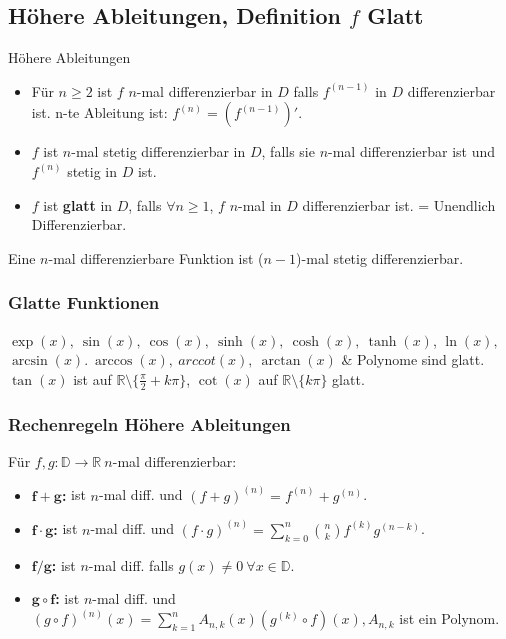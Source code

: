\documentclass[a4paper]{article}
\newcommand\R{\ensuremath{\mathbb{R}}}
\begin{document}
\subsection{Höhere Ableitungen, Definition $f$ Glatt}
\begin{mainbox}{Höhere Ableitungen}
  \begin{itemize}[leftmargin=3mm, topsep=1pt, parsep=1pt]
    \item[1.] Für $n \geq 2$ ist $f$ $n$-mal differenzierbar in $D$ falls $f^{(n-1)}$ in $D$ differenzierbar ist. n-te Ableitung ist: $f^{(n)} = (f^{(n-1)})'$.
    \item[2.] $f$ ist $n$-mal stetig differenzierbar in $D$, falls sie $n$-mal differenzierbar ist und $f^{(n)}$ stetig in $D$ ist.
    \item[3.] $f$ ist \textbf{glatt} in $D$, falls $\forall n \geq 1$, $f$ $n$-mal in $D$ differenzierbar ist. 
        \tiny \color{gray}
          = Unendlich Differenzierbar.
        \normalsize \color{black}
  \end{itemize}
  Eine $n$-mal differenzierbare Funktion ist ($n-1$)-mal stetig differenzierbar.
\end{mainbox}

\subsubsection*{Glatte Funktionen}
$\exp(x), \ \sin(x), \ \cos(x), \ \sinh(x), \ \cosh(x), \ \tanh(x)$, $\ln(x),$ \\ $\arcsin(x). \ \arccos(x), \ arccot(x), \ \arctan(x)$ \& Polynome sind glatt. $\tan(x)$ ist auf $\mathbb{R} \setminus \{\frac{\pi}{2} + k\pi\}$, $\cot(x)$ auf $\mathbb{R} \setminus \{k\pi\}$ glatt.

\subsubsection*{Rechenregeln Höhere Ableitungen}
Für $f,g: \mathbb{D} \to \R \ n$-mal differenzierbar:
\begin{itemize}[leftmargin=4.5mm, topsep=1pt, parsep=1pt]
    \item \textbf{$\mathbf{f + g}$:} ist $n$-mal diff. und $(f + g)^{(n)} = f^{(n)} + g^{(n)}$.
    \item \textbf{$\mathbf{f \cdot g}$:} ist $n$-mal diff. und $(f \cdot g)^{(n)} = \sum_{k=0}^{n} \binom{n}{k}f^{(k)} g^{(n-k)}$.
    \item \textbf{$\mathbf{f / g}$:} ist $n$-mal diff. falls $g(x) \neq 0 \ \forall x \in \mathbb{D}$.
    \item \textbf{$\mathbf{g \circ f}$:} ist $n$-mal diff. und $(g \circ f)^{(n)}(x) =  \sum_{k=1}^{n} A_{n,k}(x)\left( g^{(k)} \circ f \right) (x), A_{n,k}$ ist ein Polynom.
\end{itemize}
\end{document}
